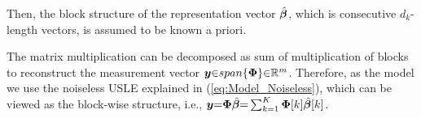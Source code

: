  
Then, the block structure of the representation vector $\hat{\boldsymbol{\beta}}$, which is consecutive $d_k$-length vectors, is assumed to be known a priori.
 
 
The matrix multiplication can be decomposed as sum of multiplication of blocks to reconstruct the measurement vector $\boldsymbol{y} {\in} span \{ \boldsymbol{\Phi} \} {\in} \mathbb{R}^{m}$.
Therefore, as the model we use the noiseless USLE explained in (\ref{eq:Model_Noiseless}), which can be viewed as the block-wise structure, i.e., $\boldsymbol{y} {=} \boldsymbol{\Phi} \hat{\boldsymbol{\beta}} {=} \sum_{k=1}^{K} \boldsymbol{\Phi}[k] \hat{\boldsymbol{\beta}} [k]$.